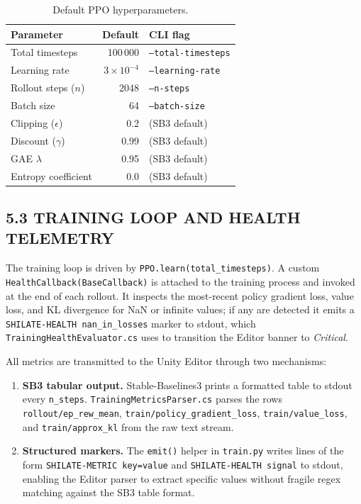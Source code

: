 \documentclass[12pt,a4paper]{article}
\begin{document}
\begin{table}[H]
  \centering
  \caption{Default PPO hyperparameters.}
  \label{tab:ppo-params}
  \vspace{0.5\baselineskip}
  \begin{tabular}{lrl}
    \toprule
    \textbf{Parameter} & \textbf{Default} & \textbf{CLI flag} \\
    \midrule
    Total timesteps      & 100\,000  & \texttt{--total-timesteps} \\
    Learning rate        & $3 \times 10^{-4}$ & \texttt{--learning-rate} \\
    Rollout steps ($n$)  & 2048      & \texttt{--n-steps} \\
    Batch size           & 64        & \texttt{--batch-size} \\
    Clipping ($\epsilon$)& 0.2       & (SB3 default) \\
    Discount ($\gamma$)  & 0.99      & (SB3 default) \\
    GAE $\lambda$        & 0.95      & (SB3 default) \\
    Entropy coefficient  & 0.0       & (SB3 default) \\
    \bottomrule
  \end{tabular}
\end{table}

\subsection*{5.3 \quad TRAINING LOOP AND HEALTH TELEMETRY}

\indent The training loop is driven by \texttt{PPO.learn(total\_timesteps)}.
A custom \texttt{HealthCallback(BaseCallback)} is attached to the training
process and invoked at the end of each rollout. It inspects the most-recent
policy gradient loss, value loss, and KL divergence for NaN or infinite values;
if any are detected it emits a \texttt{SHILATE-HEALTH nan\_in\_losses} marker
to stdout, which \texttt{TrainingHealthEvaluator.cs} uses to transition the
Editor banner to \emph{Critical}.

All metrics are transmitted to the Unity Editor through two mechanisms:

\begin{enumerate}[leftmargin=2.5cm]
  \item \textbf{SB3 tabular output.}  Stable-Baselines3 prints a formatted
    table to stdout every \texttt{n\_steps}. \texttt{TrainingMetricsParser.cs}
    parses the rows \texttt{rollout/ep\_rew\_mean},
    \texttt{train/policy\_gradient\_loss}, \texttt{train/value\_loss}, and
    \texttt{train/approx\_kl} from the raw text stream.
  \item \textbf{Structured markers.} The \texttt{emit()} helper in
    \texttt{train.py} writes lines of the form
    \texttt{SHILATE-METRIC key=value} and \texttt{SHILATE-HEALTH signal} to
    stdout, enabling the Editor parser to extract specific values without
    fragile regex matching against the SB3 table format.
\end{enumerate}
\end{document}
